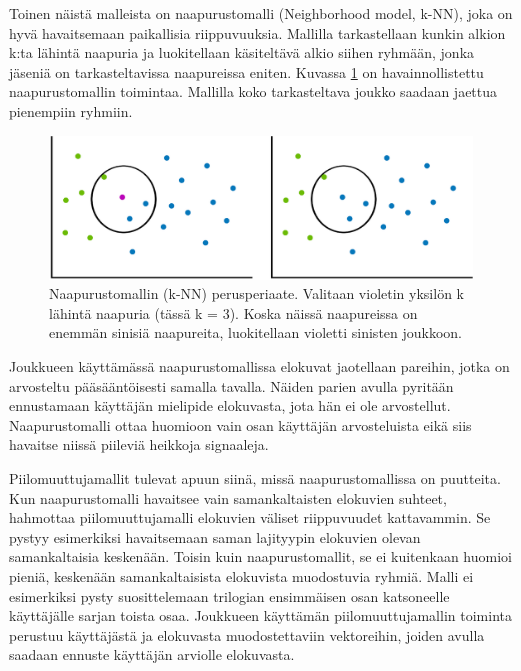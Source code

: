 \documentclass[12pt,finnish]{tktltiki2}
\theoremstyle{definition}
\theoremstyle{remark}
\begin{document}
        Toinen näistä malleista on naapurustomalli (Neighborhood model, k-NN), joka on hyvä havaitsemaan paikallisia riippuvuuksia. Mallilla tarkastellaan kunkin alkion k:ta lähintä naapuria ja luokitellaan käsiteltävä alkio siihen ryhmään, jonka jäseniä on tarkasteltavissa naapureissa eniten. Kuvassa \ref{knn} on havainnollistettu naapurustomallin toimintaa. Mallilla koko tarkasteltava joukko saadaan jaettua pienempiin ryhmiin.
        
\begin{figure}[]
\includegraphics[width = 370pt]{knnkumpikin.eps}\caption{Naapurustomallin (k-NN) perusperiaate. Valitaan violetin yksilön k lähintä naapuria (tässä k = 3). Koska näissä naapureissa on enemmän sinisiä naapureita, luokitellaan violetti sinisten joukkoon.}
\label{knn}
\end{figure} 
 
Joukkueen käyttämässä naapurustomallissa elokuvat jaotellaan pareihin, jotka on arvosteltu pääsääntöisesti samalla tavalla. Näiden parien avulla pyritään ennustamaan käyttäjän mielipide elokuvasta, jota hän ei ole arvostellut. Naapurustomalli ottaa huomioon vain osan käyttäjän arvosteluista eikä siis havaitse niissä piileviä heikkoja signaaleja. 

	Piilomuuttujamallit tulevat apuun siinä, missä naapurustomallissa on puutteita. Kun naapurustomalli havaitsee vain samankaltaisten elokuvien suhteet, hahmottaa piilomuuttujamalli elokuvien väliset riippuvuudet kattavammin. Se pystyy esimerkiksi havaitsemaan saman lajityypin elokuvien olevan samankaltaisia keskenään. Toisin kuin naapurustomallit, se ei kuitenkaan huomioi pieniä, keskenään samankaltaisista elokuvista muodostuvia ryhmiä. Malli ei esimerkiksi pysty suosittelemaan trilogian ensimmäisen osan katsoneelle käyttäjälle sarjan toista osaa. Joukkueen käyttämän piilomuuttujamallin toiminta perustuu käyttäjästä ja elokuvasta muodostettaviin vektoreihin, joiden avulla saadaan ennuste käyttäjän arviolle elokuvasta.
        
\end{document}
